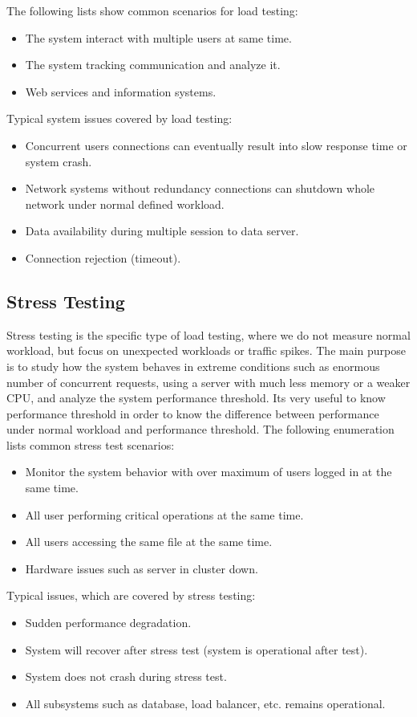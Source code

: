 The following lists show common scenarios for load testing:
\begin{itemize}
	\setlength\itemsep{0em}
	\item The system interact with multiple users at same time.
	\item The system tracking communication and analyze it.
	\item Web services and information systems.
\end{itemize}
Typical system issues covered by load testing:
\begin{itemize}
	\setlength\itemsep{0em}
	\item Concurrent users connections can eventually result into slow response time or system crash.
	\item Network systems without redundancy connections can shutdown whole network under normal defined workload.
	\item Data availability during multiple session to data server.
	\item Connection rejection (timeout).
\end{itemize}

\subsection*{Stress Testing}
\label{Stress Testing}
Stress testing is the specific type of load testing, where we do not measure normal workload, but focus on unexpected workloads or traffic spikes. The main purpose is to study how the system behaves in extreme conditions such as enormous number of concurrent requests, using a server with much less memory or a weaker CPU, and analyze the system performance threshold. Its very useful to know performance threshold in order to know the difference between performance under normal workload and performance threshold. The following enumeration lists common stress test scenarios: 
\begin{itemize}
	\setlength\itemsep{0em}
	\item Monitor the system behavior with over maximum of users logged in at the same time.
	\item All user performing critical operations at the same time.
	\item All users accessing the same file at the same time.
	\item Hardware issues such as server in cluster down.
\end{itemize} 
Typical issues, which are covered by stress testing:
\begin{itemize}
	\setlength\itemsep{0em}
	\item Sudden performance degradation.
	\item System will recover after stress test (system is operational after test).
	\item System does not crash during stress test.
	\item All subsystems such as database, load balancer, etc. remains operational.
\end{itemize}

